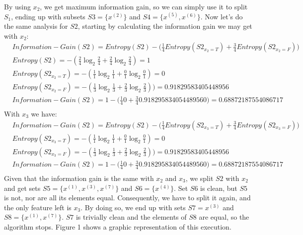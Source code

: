 \documentclass[leqno]{article}
\begin{document}
By using $x_2$, we get maximum information gain, so we can simply use it to split $S_1$, ending up with subsets 
$S3 = \{x^{(2)}\}$ and $S4 = \{x^{(5)}, x^{(6)}\}$. Now let's do the same analysis for $S2$, starting by calculating the information 
gain we may get with $x_2$:
\begin{equation*}
\begin{split}
&Information-Gain(S2) = Entropy(S2) - \Big(\frac{1}{4}Entropy(S2_{x_2 = T}) + \frac{3}{4}Entropy(S2_{x_2 = F})\Big)\\
&Entropy(S2) = -(\frac{2}{4}\log_2\frac{2}{4} + \frac{2}{4}\log_2\frac{2}{4}) = 1 \\
&Entropy(S2_{x_2 = T}) = -(\frac{1}{1}\log_2\frac{1}{1} + \frac{0}{1}\log_2\frac{0}{1}) = 0\\
&Entropy(S2_{x_2 = F}) = -(\frac{1}{3}\log_2\frac{1}{3} + \frac{2}{3}\log_2\frac{2}{3})) = 0.91829583405448956\\
&Information-Gain(S2) = 1 -\Big(\frac{1}{4}0 + \frac{3}{4}0.918295834054489560\Big) = 0.68872187554086717\\
\end{split}
\end{equation*}
With $x_3$ we have:
\begin{equation*}
\begin{split}
&Information-Gain(S2) = Entropy(S2) - \Big(\frac{1}{4}Entropy(S2_{x_3 = T}) + \frac{3}{4}Entropy(S2_{x_3 = F})\Big)\\
&Entropy(S2_{x_3 = T}) = -(\frac{1}{1}\log_2\frac{1}{1} + \frac{0}{1}\log_2\frac{0}{1}) = 0\\
&Entropy(S2_{x_3 = F}) = -(\frac{1}{3}\log_2\frac{1}{3} + \frac{2}{3}\log_2\frac{2}{3})) = 0.91829583405448956\\
&Information-Gain(S2) = 1 -\Big(\frac{1}{4}0 + \frac{3}{4}0.918295834054489560\Big) = 0.68872187554086717\\
\end{split}
\end{equation*}
Given that the information gain is the same with $x_2$ and $x_3$, we split $S2$ with $x_2$ and get sets 
$S5 = \{x^{(1)}, x^{(3)}, x^{(7)}\}$ and $S6 = \{x^{(4)}\}$. Set $S6$ is clean, but $S5$ is not, nor are all its 
elements equal. Consequently, we have to split it again, and the only feature left is $x_3$. By doing so, we end up 
with sets $S7 =  x^{(3)}$ and $S8 = \{x^{(1)}, x^{(7)}\}$. $S7$ is trivially clean and the elements of $S8$ are equal, so the 
algorithm stops. Figure 1 shows a graphic representation of this execution.
\end{document}
